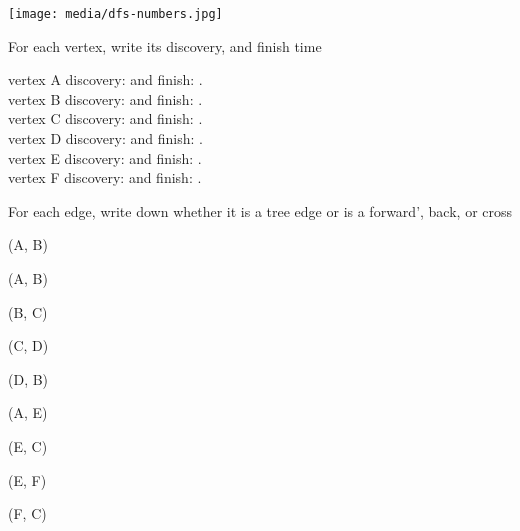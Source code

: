 \vspace{.1in}
\noindent
\begin{minipage}{.45\textwidth}
\begin{center}
  \texttt{[image: media/dfs-numbers.jpg]}\\[.2in]
\end{center}
\end{minipage}



\begin{problem}
For each vertex, write its discovery, and finish time

\ask vertex A \solfin discovery:  and  finish: . 
\\
\ask vertex B \solfin discovery:   and  finish: .
\\
\ask vertex C \solfin discovery:  and finish: .
\\
\ask vertex D \solfin discovery:  and finish:  .
\\
\ask vertex E \solfin discovery:  and finish: .
\\
\ask vertex F \solfin discovery:   and finish: .
\end{problem}


\begin{problem}[9.]

For each edge, write down whether it is a tree edge or is a
forward', back, or cross

\ask
(A, B)
\solfin {}

\ask
(A, B) 
\solfin {}

\ask (B, C)
\solfin {}

\ask (C, D)
\solfin {}

\ask (D, B)
\solfin {}

\ask (A, E) 
\solfin {}

\ask (E, C) 
\solfin {}

\ask (E, F)
\solfin {}

\ask (F, C) 
\solfin {}
\end{problem}


